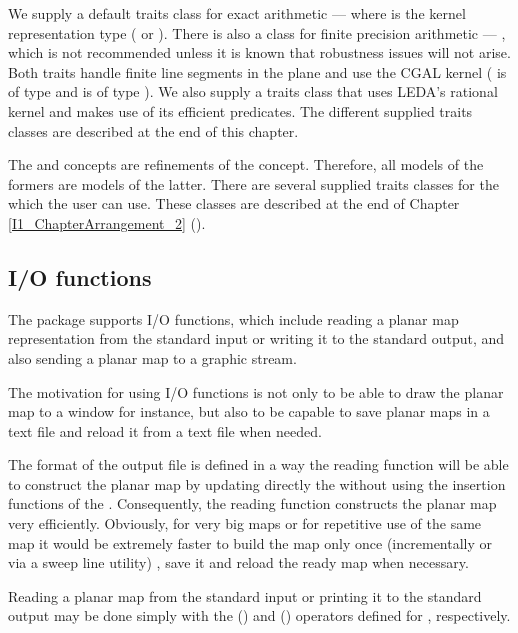 We supply a default traits class for exact arithmetic ---
where  is the kernel representation type
( or ).  There is also a class
for finite precision arithmetic --- ,
which is not recommended unless it is known that robustness issues will not
arise. 
Both traits handle
finite line segments in the plane
and use the CGAL kernel ( is of type 
 and  is of type
).
We also supply a traits class that uses LEDA's rational kernel and makes use
of its efficient predicates. The different supplied traits classes are described at the end of this chapter.

The  and  
concepts are refinements of the  concept.
Therefore, all models of the formers are models of the latter. 
There are several supplied traits classes for the  which the user can use. 
These classes are described at the end of Chapter \ref{I1_ChapterArrangement_2}
().

\subsection*{I/O functions}
The  package supports I/O functions, which include reading a planar map representation from 
the standard input or writing it to the standard output, 
and also sending a planar map to a graphic stream.

The motivation for using I/O functions is not only to be able to draw 
the planar map to a window for instance, 
but also to be capable to save planar maps in a text file
and reload it from a text file when needed.

The format of the output file is defined in a way the reading function
will be able to construct the planar map by updating directly the
 without using the insertion functions of the .  Consequently, the reading function constructs the planar map
very efficiently. Obviously, for very big maps or for repetitive use
of the same map it would be extremely faster to build the map only once 
(incrementally or via a sweep line utility)
, save it and reload the ready map when necessary.

Reading a planar map from the standard input or printing it to the
standard output may be done simply with the  (\ccc{ >>
}) and  (\ccc{ << }) operators defined for
, respectively. 

